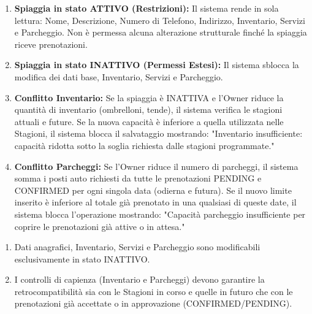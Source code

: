 \documentclass{article}
\begin{document}
	{
		\begin{enumerate}[nosep, leftmargin=25px]
			\item[\textbf{3a.}] \textbf{Spiaggia in stato ATTIVO (Restrizioni):} Il sistema rende in sola lettura: Nome, Descrizione, Numero di Telefono, Indirizzo, Inventario, Servizi e Parcheggio. Non è permessa alcuna alterazione strutturale finché la spiaggia riceve prenotazioni.
			\item[\textbf{3b.}] \textbf{Spiaggia in stato INATTIVO (Permessi Estesi):} Il sistema sblocca la modifica dei dati base, Inventario, Servizi e Parcheggio.
			\item[\textbf{6a-e.}] \textbf{Conflitto Inventario:} Se la spiaggia è INATTIVA e l'Owner riduce la quantità di inventario (ombrelloni, tende), il sistema verifica le stagioni attuali e future. Se la nuova capacità è inferiore a quella utilizzata nelle Stagioni, il sistema blocca il salvataggio mostrando: "Inventario insufficiente: capacità ridotta sotto la soglia richiesta dalle stagioni programmate."
			\item[\textbf{6b-e.}] \textbf{Conflitto Parcheggi:} Se l'Owner riduce il numero di parcheggi, il sistema somma i posti auto richiesti da tutte le prenotazioni PENDING e CONFIRMED per ogni singola data (odierna e futura). Se il nuovo limite inserito è inferiore al totale già prenotato in una qualsiasi di queste date, il sistema blocca l'operazione mostrando: "Capacità parcheggio insufficiente per coprire le prenotazioni già attive o in attesa."
		\end{enumerate}
	}
	{
		\begin{enumerate}[nosep, leftmargin=*]
			\item[•] Dati anagrafici, Inventario, Servizi e Parcheggio sono modificabili esclusivamente in stato INATTIVO.
			\item[•] I controlli di capienza (Inventario e Parcheggi) devono garantire la retrocompatibilità sia con le Stagioni in corso e quelle in futuro che con le prenotazioni già accettate o in approvazione (CONFIRMED/PENDING).
		\end{enumerate}
	}
		
	\newpage
	
\end{document}
